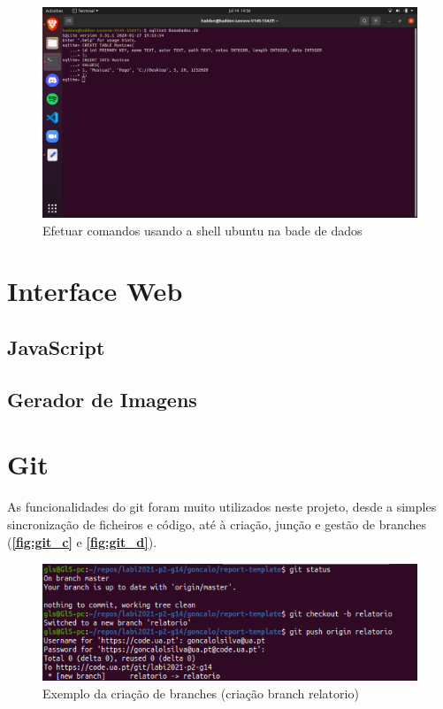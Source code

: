 \documentclass{report}
\begin{document}
\begin{figure}[!h]
\center 
\includegraphics[width=330pt]{img/sql_2.png}
\caption{Efetuar comandos usando a shell ubuntu na bade de dados}
\label{fig:sql2}
\end{figure}

\section{Interface Web}
\label{sec:interfaceWeb}

\subsection{JavaScript}
\label{ssec:JS}

\subsection{Gerador de Imagens}
\label{ssec:geradorImagens}

\section{Git}
\label{sec:git}
As funcionalidades do git foram muito utilizados neste projeto, desde a simples sincronização 
de ficheiros e código, até à criação, junção e gestão de branches (\textbf{\autoref{fig:git_c}} e 
\textbf{\autoref{fig:git_d}}). 
\cite{git}

\begin{figure}[!h]
\center 
\includegraphics[height=100pt]{img/git_1.png}
\caption{Exemplo da criação de branches (criação branch relatorio)}
\label{fig:git_c}
\end{figure}
\end{document}
